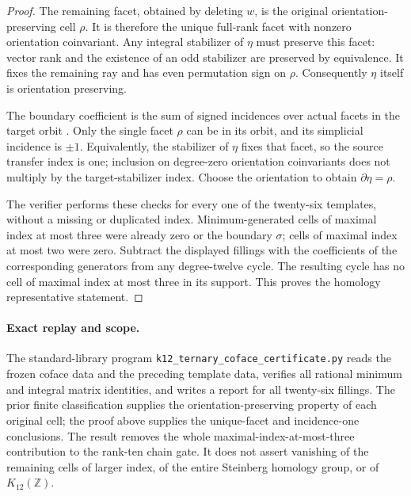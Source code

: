 \begin{proof}
The remaining facet, obtained by deleting $w$, is the original
orientation-preserving cell $\rho$. It is therefore the unique
full-rank facet with nonzero orientation coinvariant. Any integral
stabilizer of $\eta$ must preserve this facet: vector rank and the
existence of an odd stabilizer are preserved by equivalence. It fixes
the remaining ray and has even permutation sign on $\rho$.
Consequently $\eta$ itself is orientation preserving.

The boundary coefficient is the sum of signed incidences over actual
facets in the target orbit
\cite[\S1.2.1, equations~(1)--(2), p.~4]{DEKM2026}.
Only the single facet $\rho$ can be in its orbit, and its simplicial
incidence is $\pm1$. Equivalently, the stabilizer of $\eta$ fixes
that facet, so the source transfer index is one; inclusion on
degree-zero orientation coinvariants does not multiply by the
target-stabilizer index. Choose the orientation to obtain
$\partial\eta=\rho$.

The verifier performs these checks for every one of the twenty-six
templates, without a missing or duplicated index. Minimum-generated
cells of maximal index at most three were already zero or the
boundary $\sigma$; cells of maximal index at most two were zero.
Subtract the displayed fillings with the coefficients of the
corresponding generators from any degree-twelve cycle. The resulting
cycle has no cell of maximal index at most three in its support.
This proves the homology representative statement.
\end{proof}

\paragraph{Exact replay and scope.}
The standard-library program
\texttt{k12\_ternary\_coface\_certificate.py} reads the frozen
coface data and the preceding template data, verifies all rational
minimum and integral matrix identities, and writes a report for all
twenty-six fillings. The prior finite classification supplies the
orientation-preserving property of each original cell; the proof
above supplies the unique-facet and incidence-one conclusions.
The result removes the whole maximal-index-at-most-three contribution
to the rank-ten chain gate. It does not assert vanishing of the
remaining cells of larger index, of the entire Steinberg homology
group, or of $K_{12}(\mathbb Z)$.
